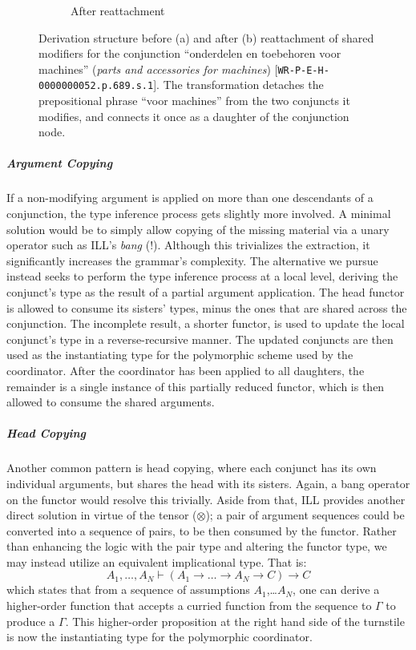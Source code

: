 \begin{figure}[t]
\begin{subfigure}[t]{0.49\textwidth}
        \caption{After reattachment}
    \end{subfigure}
    \caption[Conjunction Modifier Reattachment]{Derivation structure before (a) and after (b) reattachment of shared modifiers for the conjunction ``onderdelen en toebehoren voor machines'' (\textit{parts and accessories for machines}) [\texttt{WR-P-E-H-0000000052.p.689.s.1}]. The transformation detaches the prepositional phrase ``voor machines'' from the two conjuncts it modifies, and connects it once as a daughter of the conjunction node.}
\end{figure}

\subparagraph{Argument Copying} 
If a non-modifying argument is applied on more than one descendants of a conjunction, the type inference process gets slightly more involved.
A minimal solution would be to simply allow copying of the missing material via a unary operator such as ILL's \textit{bang} (!).
Although this trivializes the extraction, it significantly increases the grammar's complexity.
The alternative we pursue instead seeks to perform the type inference process at a local level, deriving the conjunct's type as the result of a partial argument application.
The head functor is allowed to consume its sisters' types, minus the ones that are shared across the conjunction.
The incomplete result, a shorter functor, is used to update the local conjunct's type in a reverse-recursive manner.
The updated conjuncts are then used as the instantiating type for the polymorphic scheme used by the coordinator.
After the coordinator has been applied to all daughters, the remainder is a single instance of this partially reduced functor, which is then allowed to consume the shared arguments.

\subparagraph{Head Copying}
Another common pattern is head copying, where each conjunct has its own individual arguments, but shares the head with its sisters.
Again, a bang operator on the functor would resolve this trivially.
Aside from that, ILL provides another direct solution in virtue of the tensor ($\otimes$); a pair of argument sequences could be converted into a sequence of pairs, to be then consumed by the functor.
Rather than enhancing the logic with the pair type and altering the functor type, we may instead utilize an equivalent implicational type.
That is:
\[
A_1, \dots, A_N \vdash (A_1 \rightarrow \dots \rightarrow A_N \rightarrow C) \rightarrow C
\]
which states that from a sequence of assumptions $A_1$,\dots $A_N$, one can derive a higher-order function that accepts a curried function from the sequence to $\Gamma$ to produce a $\Gamma$.
This higher-order proposition at the right hand side of the turnstile is now the instantiating type for the polymorphic coordinator.

